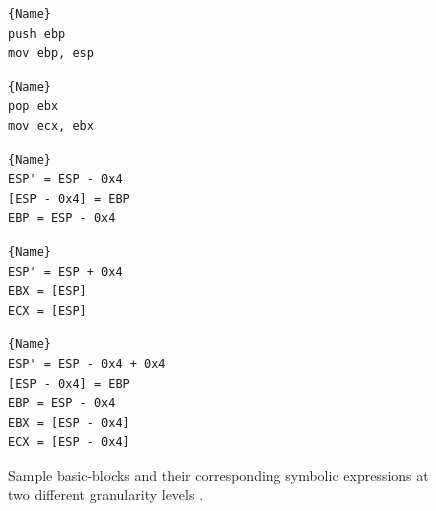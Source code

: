 \begin{figure}
\centering
\noindent
\begin{minipage}{.11\textwidth}
\begin{lstlisting}[caption=BB1,frame=tlrb]{Name}
push ebp
mov ebp, esp
\end{lstlisting}
\end{minipage}\hfill
\begin{minipage}{.11\textwidth}
\begin{lstlisting}[caption=BB2,frame=tlrb]{Name}
pop ebx
mov ecx, ebx 
\end{lstlisting}
\end{minipage}\hfill
\begin{minipage}{.15\textwidth}
\begin{lstlisting}[caption=sym. expr for BB1 (1-tracelet model),frame=tlrb]{Name}
ESP' = ESP - 0x4
[ESP - 0x4] = EBP
EBP = ESP - 0x4
\end{lstlisting}
\end{minipage}\hfill

\begin{minipage}{.15\textwidth}
\begin{lstlisting}[caption=sym. expr for BB2 (1-tracelet model),frame=tlrb]{Name}
ESP' = ESP + 0x4
EBX = [ESP]
ECX = [ESP]
\end{lstlisting}
\end{minipage}\hfill
\begin{minipage}{.20\textwidth}
\begin{lstlisting}[caption=sym. expr for both BBs combined (2-tracelet model),frame=tlrb]{Name}
ESP' = ESP - 0x4 + 0x4 
[ESP - 0x4] = EBP
EBP = ESP - 0x4
EBX = [ESP - 0x4]
ECX = [ESP - 0x4]
\end{lstlisting}
\end{minipage}
\caption{Sample basic-blocks and their corresponding symbolic expressions at two different granularity levels . }\label{fig:sym_expr_granu}
\end{figure}




